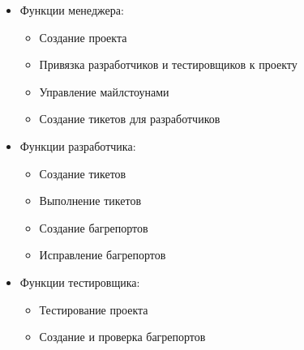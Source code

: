 \documentclass[12pt,a4paper]{article}
\begin{document}
\begin{itemize}
\item Функции менеджера:
\begin{itemize}
\item Создание проекта
\item Привязка разработчиков и тестировщиков к проекту
\item Управление майлстоунами
\item Создание тикетов для разработчиков
\end{itemize}

\item Функции разработчика:
\begin{itemize}
\item Создание тикетов
\item Выполнение тикетов
\item Создание багрепортов
\item Исправление багрепортов
\end{itemize}

\item Функции тестировщика:
\begin{itemize}
\item Тестирование проекта
\item Создание и проверка багрепортов
\end{itemize}

\end{itemize}
\end{document}
